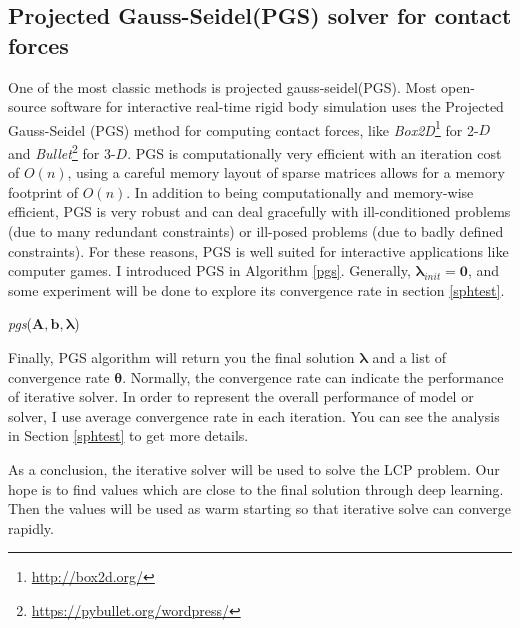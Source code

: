     \subsection{Projected Gauss-Seidel(PGS) solver for contact forces}
    One of the most classic methods is projected gauss-seidel(PGS). Most open-source software for interactive real-time rigid body simulation uses the Projected Gauss-Seidel (PGS) method for computing contact forces, like \textit{Box2D}\footnote{\url{http://box2d.org/}} for 2-$D$ and \textit{Bullet}\footnote{\url{https://pybullet.org/wordpress/}} for 3-$D$. PGS is computationally very efficient with an iteration cost of $O(n)$, using a careful memory layout of sparse matrices allows for a memory footprint of $O(n)$. In addition to being computationally and memory-wise efficient, PGS is very robust and can deal gracefully with ill-conditioned problems (due to many redundant constraints) or ill-posed problems (due to badly defined constraints). For these reasons, PGS is well suited for interactive applications like computer games. I introduced PGS in Algorithm \ref{pgs}. Generally, $\pmb{\lambda}_{init} = \pmb{0}$, and some experiment will be done to explore its convergence rate in section \ref{sphtest}.
    \begin{algorithm}[!h]
        \caption{\textit{pgs}($\pmb{A}, \pmb{b}, \pmb{\lambda}$)}
        \label{pgs}
    \end{algorithm}
    Finally, PGS algorithm will return you the final solution \(\pmb{\lambda}\) and a list of convergence rate $\pmb{\theta}$. Normally, the convergence rate can indicate the performance of iterative solver. In order to represent the overall performance of model or solver, I use average convergence rate in each iteration. You can see the analysis in Section \ref{sphtest} to get more details. 

    As a conclusion, the iterative solver will be used to solve the LCP problem. Our hope is to find values which are close to the final solution through deep learning. Then the values will be used as warm starting so that iterative solve can converge rapidly.